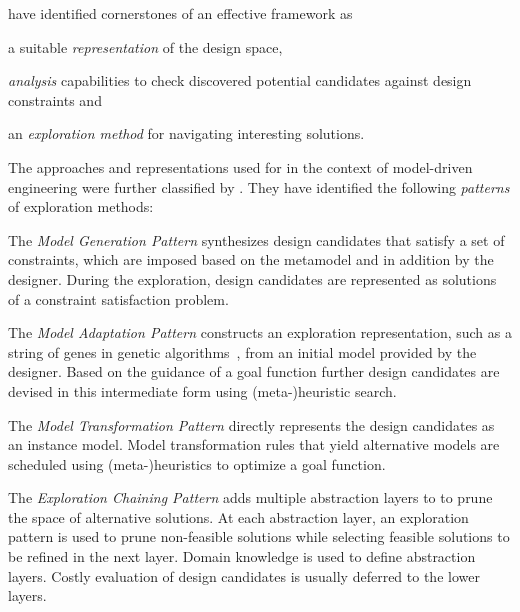 \citet{Kang10effective} have identified cornerstones of an effective  framework as
\begin{inparaenum}
\item a suitable \emph{representation} of the design space,
\item \emph{analysis} capabilities to check discovered potential candidates against design constraints and
\item an \emph{exploration method} for navigating interesting solutions.
\end{inparaenum}
The approaches and representations used for  in the context of model-driven engineering were further classified by \citet{Vanherpen14patterns}. They have identified the following \emph{ patterns} of exploration methods:
\begin{itemize*}
\item The \emph{Model Generation Pattern} synthesizes design candidates that satisfy a set of constraints, which are imposed based on the metamodel and in addition by the designer. During the exploration, design candidates are represented as solutions of a constraint satisfaction problem.
\item The \emph{Model Adaptation Pattern} constructs an exploration representation, such as a string of genes in genetic algorithms~, from an initial model provided by the designer. Based on the guidance of a goal function further design candidates are devised in this intermediate form using (meta-)heuristic search.
\item The \emph{Model Transformation Pattern} directly represents the design candidates as an instance model. Model transformation rules that yield alternative models are scheduled using (meta-)heuristics to optimize a goal function.
\item The \emph{Exploration Chaining Pattern} adds multiple abstraction layers to  to prune the space of alternative solutions. At each abstraction layer, an exploration pattern is used to prune non-feasible solutions while selecting feasible solutions to be refined in the next layer. Domain knowledge is used to define abstraction layers. Costly evaluation of design candidates is usually deferred to the lower layers.
\end{itemize*}

